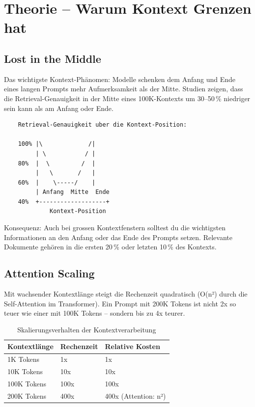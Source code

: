 \section{Theorie -- Warum Kontext Grenzen hat}

\subsection{Lost in the Middle}

Das wichtigste Kontext-Phänomen: Modelle schenken dem Anfang und Ende
eines langen Prompts mehr Aufmerksamkeit als der Mitte. Studien zeigen,
dass die Retrieval-Genauigkeit in der Mitte eines 100K-Kontexts um
30--50\,\% niedriger sein kann als am Anfang oder Ende.

\begin{verbatim}
    Retrieval-Genauigkeit uber die Kontext-Position:
    
    100% |\             /|
         | \           / |
    80%  |  \         /  |
         |   \       /   |
    60%  |    \-----/    |
         | Anfang  Mitte  Ende
    40%  +-------------------+
             Kontext-Position
\end{verbatim}

Konsequenz: Auch bei grossen Kontextfenstern solltest du die wichtigsten
Informationen an den Anfang oder das Ende des Prompts setzen. Relevante
Dokumente gehören in die ersten 20\,\% oder letzten 10\,\% des Kontexts.

\subsection{Attention Scaling}

Mit wachsender Kontextlänge steigt die Rechenzeit quadratisch
(O(n²) durch die Self-Attention im Transformer). Ein Prompt mit
200K Tokens ist nicht 2x so teuer wie einer mit 100K Tokens --
sondern bis zu 4x teurer.

\begin{table}[H]
\centering
\begin{tabularx}{\linewidth}{lXX}
\toprule
\textbf{Kontextlänge} & \textbf{Rechenzeit} & \textbf{Relative Kosten} \\
\midrule
1K Tokens & 1x & 1x \\
10K Tokens & 10x & 10x \\
100K Tokens & 100x & 100x \\
200K Tokens & 400x & 400x (Attention: n²) \\
\bottomrule
\end{tabularx}
\caption{Skalierungsverhalten der Kontextverarbeitung}
\end{table}

